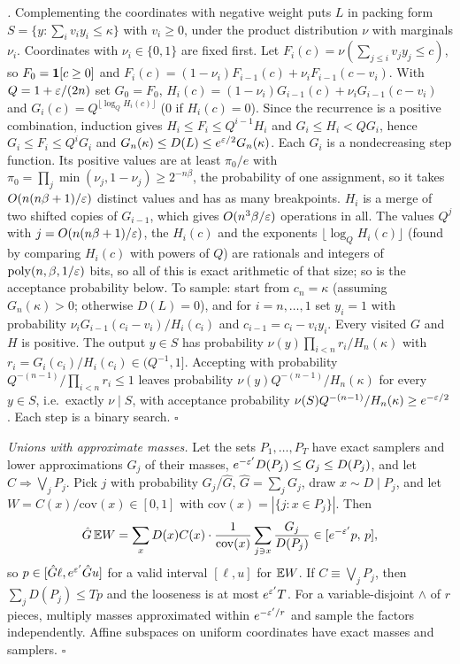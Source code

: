 \emph{.} Complementing the coordinates with negative weight puts $L$ in
packing form $S=\{y:\sum_iv_iy_i\le\kappa\}$ with $v_i\ge0$, under the product
distribution $\nu$ with marginals $\nu_i$. Coordinates with $\nu_i\in\{0,1\}$ are fixed
first. Let $F_i(c)=\nu(\sum_{j\le i}v_jy_j\le c)$, so $F_0=\mathbf{1}[c\ge0]$ and
$F_i(c)=(1-\nu_i)F_{i-1}(c)+\nu_iF_{i-1}(c-v_i)$. With $Q=1+\varepsilon/(2n)$ set $G_0=F_0$,
$H_i(c)=(1-\nu_i)G_{i-1}(c)+\nu_iG_{i-1}(c-v_i)$ and $G_i(c)=Q^{\lfloor\log_QH_i(c)\rfloor}$
($0$ if $H_i(c)=0$). Since the recurrence is a positive combination, induction gives
$H_i\le F_i\le Q^{i-1}H_i$ and $G_i\le H_i<QG_i$, hence $G_i\le F_i\le Q^iG_i$ and
$G_n(\kappa)\le D(L)\le e^{\varepsilon/2}G_n(\kappa)$. Each $G_i$ is a nondecreasing step
function. Its positive values are at least $\pi_0/e$ with
$\pi_0=\prod_j\min(\nu_j,1-\nu_j)\ge2^{-n\beta}$, the probability of one assignment, so it
takes $O(n(n\beta+1)/\varepsilon)$ distinct values and has as many breakpoints. $H_i$ is a merge of
two shifted copies of $G_{i-1}$, which gives $O(n^3\beta/\varepsilon)$ operations in all. The
values $Q^j$ with $j=O(n(n\beta+1)/\varepsilon)$, the $H_i(c)$ and the exponents
$\lfloor\log_QH_i(c)\rfloor$ (found by comparing $H_i(c)$ with powers of $Q$) are
rationals and integers of $\mathrm{poly}(n,\beta,1/\varepsilon)$ bits, so all of this is exact arithmetic
of that size; so is the acceptance probability below. To
sample: start from $c_n=\kappa$ (assuming $G_n(\kappa)>0$; otherwise $D(L)=0$), and for
$i=n,\dots,1$ set $y_i=1$ with probability $\nu_iG_{i-1}(c_i-v_i)/H_i(c_i)$ and
$c_{i-1}=c_i-v_iy_i$. Every visited $G$ and $H$ is positive. The output $y\in S$ has
probability
$\nu(y)\prod_{i<n}r_i/H_n(\kappa)$ with $r_i=G_i(c_i)/H_i(c_i)\in(Q^{-1},1]$. Accepting
with probability $Q^{-(n-1)}/\prod_{i<n}r_i\le1$ leaves probability
$\nu(y)Q^{-(n-1)}/H_n(\kappa)$ for every $y\in S$, i.e.\ exactly $\nu\mid S$, with
acceptance probability $\nu(S)Q^{-(n-1)}/H_n(\kappa)\ge e^{-\varepsilon/2}$. Each step is a
binary search. \hfill$\square$

\emph{Unions with approximate masses.} Let the sets $P_1,\dots,P_T$ have exact
samplers and lower approximations $G_j$ of their masses, $e^{-\varepsilon'}D(P_j)\le G_j\le
D(P_j)$, and let $C\Rightarrow\bigvee_jP_j$.
Pick $j$ with probability $G_j/\hat G$, $\hat G=\sum_jG_j$, draw $x\sim D\mid P_j$, and
let $W=C(x)/\mathrm{cov}(x)\in[0,1]$ with $\mathrm{cov}(x)=|\{j:x\in P_j\}|$. Then
\[
\hat G\,\mathbb{E} W=\sum_xD(x)C(x)\cdot\frac1{\mathrm{cov}(x)}\sum_{j\ni x}\frac{G_j}{D(P_j)}
\in[e^{-\varepsilon'}p,\,p],
\]
so $p\in[\hat G\ell,e^{\varepsilon'}\hat Gu]$ for a valid interval $[\ell,u]$ for $\mathbb{E} W$. If
$C\equiv\bigvee_jP_j$, then $\sum_jD(P_j)\le Tp$ and the looseness is at most $e^{\varepsilon'}T$.
For a variable-disjoint $\wedge$ of $r$ pieces, multiply masses approximated within
$e^{-\varepsilon'/r}$ and sample the factors independently. Affine subspaces on uniform
coordinates have exact masses and samplers. \hfill$\square$


